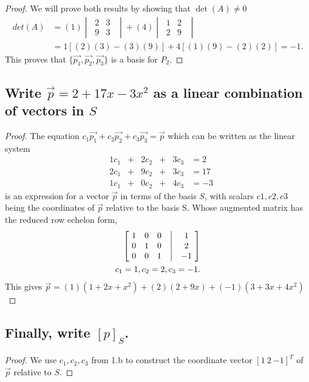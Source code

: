 \documentclass[../main.tex]{subfiles}
\begin{document}
\begin{proof}
  We will prove both results by showing that $\det(A) \neq 0$
  \begin{align*}
    det(A) & = (1)
    \begin{vmatrix}
      \ 2 & 3 \   \\
      \ 9 & 3 \ \
    \end{vmatrix}
    + (4)
    \begin{vmatrix}
      \ 1 & 2 \   \\
      \ 2 & 9 \ \
    \end{vmatrix}                            \\
           & = 1[(2)(3)-(3)(9)] + 4[(1)(9)-(2)(2)] = -1.
  \end{align*}
  This proves that $\{\vec{p_{1}}, \vec{p_{2}}, \vec{p_{3}}\}$ is a basis for $P_2$.
\end{proof}
\subsection{Write $\vec{p} = 2 + 17x - 3x^2$ as a linear combination of vectors in $S$}
\begin{proof}
  The equation $c_{1}\vec{p_{1}} + c_{2}\vec{p_{2}} + c_{3}\vec{p_{3}} = \vec{p}$ which can be written as the linear system
  $$
    \begin{matrix}
       & 1c_{1} & + & 2c_{2} & + & 3c_{3} & = 2  \\
       & 2c_{1} & + & 9c_{2} & + & 3c_{3} & = 17 \\
       & 1c_{1} & + & 0c_{2} & + & 4c_{3} & = -3
    \end{matrix}
  $$
  is an expression for a vector $\vec{p}$ in terms of the basis $S$, with scalars $c1, c2, c3$
  being the coordinates of $\vec{p}$ relative to the basis S. Whose augmented matrix has the reduced row echelon form,
  \begin{align*}
    \begin{bmatrix}
      \ 1 & 0 & 0 & \bigm| & 1  \ \\
      \ 0 & 1 & 0 & \bigm| & 2  \ \\
      \ 0 & 0 & 1 & \bigm| & -1 \
    \end{bmatrix} \\
    c_{1} = 1, c_{2} = 2, c_{3} = -1.
  \end{align*}
  This gives $\vec{p} = (1)(1+2x+x^2) + (2)(2 + 9x) + (-1)(3 + 3x + 4x^2)$
\end{proof}
\subsection{Finally, write $[p]_S$.}
\begin{proof}
  We use $c_{1}, c_{2}, c_{3}$ from 1.b to construct the coordinate vector $[1\ 2\ {-1}]^{T}$ of $\vec{p}$ relative to $S$.
\end{proof}
\end{document}
